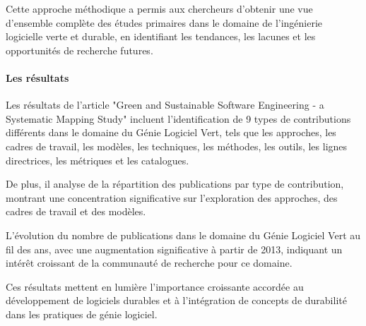 Cette approche méthodique a permis aux chercheurs d'obtenir une vue d'ensemble complète des études primaires dans le domaine de l'ingénierie logicielle verte et durable, en identifiant les tendances, les lacunes et les opportunités de recherche futures.

\paragraph{Les résultats}
Les résultats de l'article "Green and Sustainable Software Engineering - a Systematic Mapping Study" incluent l'identification de 9 types de contributions différents dans le domaine du Génie Logiciel Vert, tels que les approches, les cadres de travail, les modèles, les techniques, les méthodes, les outils, les lignes directrices, les métriques et les catalogues.

De plus, il analyse de la répartition des publications par type de contribution, montrant une concentration significative sur l'exploration des approches, des cadres de travail et des modèles.

L'évolution du nombre de publications dans le domaine du Génie Logiciel Vert au fil des ans, avec une augmentation significative à partir de 2013, indiquant un intérêt croissant de la communauté de recherche pour ce domaine.

Ces résultats mettent en lumière l'importance croissante accordée au développement de logiciels durables et à l'intégration de concepts de durabilité dans les pratiques de génie logiciel.